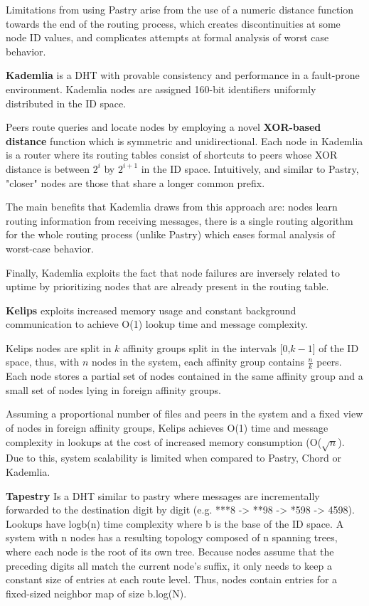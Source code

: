 Limitations from using Pastry arise from the use of a numeric distance function towards the end of the routing process, which creates discontinuities at some node ID values, and complicates attempts at formal analysis of worst case behavior.

\textbf{Kademlia} \cite{maymounkov2002kademlia} is a DHT with provable consistency and performance in a fault-prone environment. Kademlia nodes are assigned 160-bit identifiers uniformly distributed in the ID space.

Peers route queries and locate nodes by employing a novel \textbf{XOR-based distance} function which is symmetric and unidirectional. Each node in Kademlia is a router where its routing tables consist of shortcuts to peers whose XOR distance is between \(2^{i}\) by \(2^{i + 1}\) in the ID space. Intuitively, and similar to Pastry, "closer" nodes are those that share a longer common prefix.

The main benefits that Kademlia draws from this approach are: nodes learn routing information from receiving messages, there is a single routing algorithm for the whole routing process (unlike Pastry) which eases formal analysis of worst-case behavior. 

Finally, Kademlia exploits the fact that node failures are inversely related to uptime by prioritizing nodes that are already present in the routing table.

\textbf{Kelips} \cite{gupta2003kelips} exploits increased memory usage and constant background communication to achieve O(1) lookup time and message complexity. 

Kelips nodes are split in $k$ affinity groups split in the intervals [0,$k-1$] of the ID space, thus, with $n$ nodes in the system, each affinity group contains $\frac{n}{k}$ peers.  Each node stores a partial set of nodes contained in the same affinity group and a small set of nodes lying in foreign affinity groups.

Assuming a proportional number of files and peers in the system and a fixed view of nodes in foreign affinity groups, Kelips achieves O(1) time and message complexity in lookups at the cost of increased memory consumption (O($\sqrt{n}$). Due to this, system scalability is limited when compared to Pastry, Chord or Kademlia. 

\textbf{Tapestry} \cite{tapestry} Is a DHT similar to pastry where messages are incrementally forwarded to the destination digit by digit (e.g. ***8 -> **98 -> *598 -> 4598). Lookups have logb(n) time complexity where b is the base of the ID space. A system with n nodes has a resulting topology composed of n spanning trees, where each node is the root of its own tree. Because nodes assume that the preceding digits all match the current node's suffix, it only needs to keep a constant size of entries at each route level. Thus, nodes contain entries for a fixed-sized neighbor map of size b.log(N). 

